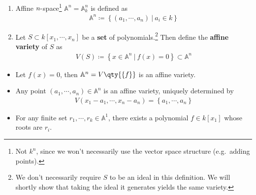 \begin{definition}

\envlist

\begin{enumerate}
\def\labelenumi{\arabic{enumi}.}
\item
  Affine \(n{\hbox{-}}\)space\footnote{Not \(k^n\), since we won't
    necessarily use the vector space structure (e.g.~adding points).}
  \({\mathbb{A}}^n = {\mathbb{A}}_k^n\) is defined as
  \begin{align*}
  {\mathbb{A}}^n \coloneqq\left\{{(a_1, \cdots, a_n) {~\mathrel{\Big|}~}a_i \in k}\right\}
  \end{align*}
\item
  Let \(S\subset k[x_1, \cdots, x_n]\) be a \textbf{set} of
  polynomials.\footnote{We don't necessarily require \(S\) to be an
    ideal in this definition. We will shortly show that taking the ideal
    it generates yields the same variety.} Then define the
  \textbf{affine variety} of \(S\) as
  \begin{align*}
    V(S) \coloneqq\left\{{x\in {\mathbb{A}}^n {~\mathrel{\Big|}~}f(x) = 0}\right\} \subset {\mathbb{A}}^n
    \end{align*}
\end{enumerate}

\end{definition}

\begin{example}

\envlist

\begin{itemize}
\tightlist
\item
  Let \(f(x) = 0\), then \({\mathbb{A}}^n = V\qty{\left\{{f}\right\}}\)
  is an affine variety.
\item
  Any point \((a_1, \cdots, a_n)\in {\mathbb{A}}^n\) is an affine
  variety, uniquely determined by
  \begin{align*}
  V(x_1 - a_1, \cdots, x_n - a_n) = \left\{{a_1, \cdots, a_n}\right\}
  \end{align*}
\item
  For any finite set \(r_1, \cdots, r_k \in {\mathbb{A}}^1\), there
  exists a polynomial \(f\in k[x_1]\) whose roots are \(r_i\).
\end{itemize}

\end{example}

